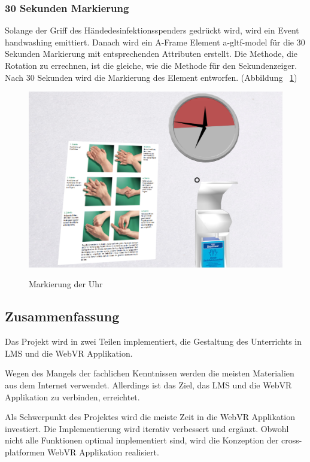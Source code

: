  \subsubsection{30 Sekunden Markierung}
 Solange der Griff des Händedesinfektionsspenders gedrückt wird, wird ein Event {\selectfont  handwashing} emittiert. Danach wird ein A-Frame Element {\selectfont  a-gltf-model} für die 30 Sekunden Markierung mit entsprechenden Attributen erstellt. Die Methode, die Rotation zu errechnen, ist die gleiche, wie die Methode für den Sekundenzeiger. Nach 30 Sekunden wird die Markierung des Element entworfen. (Abbildung ~\ref{fig:clockMarker})
 
\begin{figure}[ht]
\vspace*{1em}
\centering
\caption[Markierung der Uhr]{Markierung der Uhr}
\includegraphics[width=\textwidth]{images/clockMarker.png}
\label{fig:clockMarker} 
\end{figure}

\subsection{Zusammenfassung}
Das Projekt wird in zwei Teilen implementiert, die Gestaltung des Unterrichts in LMS und die WebVR Applikation.

Wegen des Mangels der fachlichen Kenntnissen werden die meisten Materialien aus dem Internet verwendet. Allerdings ist das Ziel, das LMS und die WebVR Applikation zu verbinden, erreichtet.

Als Schwerpunkt des Projektes wird die meiste Zeit in die WebVR Applikation investiert. Die Implementierung wird iterativ verbessert und ergänzt. Obwohl nicht alle Funktionen optimal implementiert sind, wird die Konzeption der cross-platformen WebVR Applikation realisiert.
